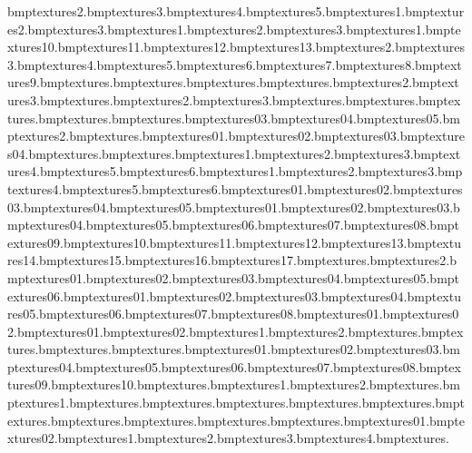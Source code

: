 bmp textures\earth2.bmp textures\earth3.bmp textures\earth4.bmp textures\earth5.bmp textures\eartskel1.bmp textures\eartskel2.bmp textures\eartskel3.bmp textures\elecbox1.bmp textures\elecbox2.bmp textures\elecbox3.bmp textures\elechut1.bmp textures\elechut10.bmp textures\elechut11.bmp textures\elechut12.bmp textures\elechut13.bmp textures\elechut2.bmp textures\elechut3.bmp textures\elechut4.bmp textures\elechut5.bmp textures\elechut6.bmp textures\elechut7.bmp textures\elechut8.bmp textures\elechut9.bmp textures\elecloop.bmp textures\eyetex.bmp textures\fblu.bmp textures\fence.bmp textures\fence2.bmp textures\fence3.bmp textures\fencesnow.bmp textures\fencesnow2.bmp textures\fencesnow3.bmp textures\fgre.bmp textures\flash.bmp textures\fpurp.bmp textures\fred.bmp textures\frozentreats.bmp textures\frozentreats03.bmp textures\frozentreats04.bmp textures\frozentreats05.bmp textures\frozentreats2.bmp textures\gate.bmp textures\gen01.bmp textures\gen02.bmp textures\gen03.bmp textures\gen04.bmp textures\grass.bmp textures\grasscracks.bmp textures\grassedge1.bmp textures\grassedge2.bmp textures\grassedge3.bmp textures\grassedge4.bmp textures\grassedge5.bmp textures\grassedge6.bmp textures\grassshad1.bmp textures\grassshad2.bmp textures\grassshad3.bmp textures\grassshad4.bmp textures\grassshad5.bmp textures\grassshad6.bmp textures\grasstocobble01.bmp textures\grasstocobble02.bmp textures\grasstocobble03.bmp textures\grasstocobble04.bmp textures\grasstocobble05.bmp textures\grasstosand01.bmp textures\grasstosand02.bmp textures\grasstosand03.bmp textures\grasstosand04.bmp textures\grasstosand05.bmp textures\grasstosand06.bmp textures\grasstosand07.bmp textures\grasstosand08.bmp textures\grasstosand09.bmp textures\grasstosand10.bmp textures\grasstosand11.bmp textures\grasstosand12.bmp textures\grasstosand13.bmp textures\grasstosand14.bmp textures\grasstosand15.bmp textures\grasstosand16.bmp textures\grasstosand17.bmp textures\housefloor.bmp textures\housefloor2.bmp textures\hubflowers01.bmp textures\hubflowers02.bmp textures\hubflowers03.bmp textures\hubflowers04.bmp textures\hubflowers05.bmp textures\hubflowers06.bmp textures\hubpath01.bmp textures\hubpath02.bmp textures\hubpath03.bmp textures\hubpath04.bmp textures\hubpath05.bmp textures\hubpath06.bmp textures\hubpath07.bmp textures\hubpath08.bmp textures\hubpathbrick01.bmp textures\hubpathbrick02.bmp textures\hubpathcorner01.bmp textures\hubpathcorner02.bmp textures\hutbrick1.bmp textures\hutbrick2.bmp textures\hutcabtowel.bmp textures\hutceiling.bmp textures\hutcooker.bmp textures\hutfloor.bmp textures\hutfood01.bmp textures\hutfood02.bmp textures\hutfood03.bmp textures\hutfood04.bmp textures\hutfood05.bmp textures\hutfood06.bmp textures\hutfood07.bmp textures\hutfood08.bmp textures\hutfood09.bmp textures\hutfood10.bmp textures\hutsign.bmp textures\hutsink1.bmp textures\hutsink2.bmp textures\hutstripes.bmp textures\hutstripes1.bmp textures\hutstripesbar.bmp textures\hutwall.bmp textures\hutwallcolours.bmp textures\hutwallpans.bmp textures\hutwallplates.bmp textures\hutwallspice.bmp textures\hutworkbread.bmp textures\hutworkbrush.bmp textures\hutworkcorner.bmp textures\hutworks.bmp textures\icecream01.bmp textures\icecream02.bmp textures\icewall1.bmp textures\icewall2.bmp textures\icewall3.bmp textures\icewall4.bmp textures.